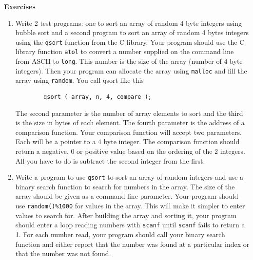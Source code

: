 \documentclass[11pt,b5paper]{book}
\begin{document}
\vfill
\break
{\bf\large Exercises}

\begin{enumerate}
    \item Write 2 test programs: one to sort an array of random 4 byte integers using bubble sort and
    a second program to sort an array of random 4 bytes integers using the {\tt qsort} function
    from the C library.
    Your program should use the C library function {\tt atol} to convert a number supplied on the command
    line from ASCII to {\tt long}.
    This number is the size of the array (number of 4 byte integers).
    Then your program can allocate the array using {\tt malloc} and fill the array
    using {\tt random}.
    You call qsort like this
    \begin{verbatim}
        qsort ( array, n, 4, compare );
    \end{verbatim}
    The second parameter is the number of array elements to sort and the third is the size in bytes of
    each element.
    The fourth parameter is the address of a comparison function.
    Your comparison function will accept two parameters.
    Each will be a pointer to a 4 byte integer.
    The comparison function should return a negative, 0 or positive value based on the ordering of the
    2 integers.  All you have to do is subtract the second integer from the first.
    
    \item Write a program to use {\tt qsort} to sort an array of random integers and use a binary search
    function to search for numbers in the array.
    The size of the array should be given as a command line parameter.
    Your program should use {\tt random()\%1000} for values in the array.
    This will make it simpler to enter values to search for.
    After building the array and sorting it, your program should enter a loop reading numbers with
    {\tt scanf} until {\tt scanf} fails to return a 1.
    For each number read, your program should call your binary search function and either report that the
    number was found at a particular index or that the number was not found.
    

\end{enumerate}
\end{document}
